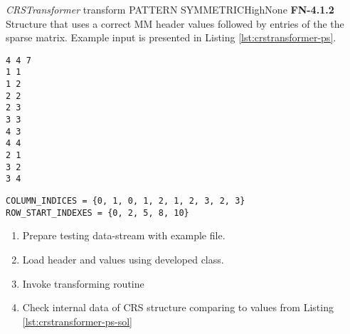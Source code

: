 \begin{testcase}{\emph{CRSTransformer} transform PATTERN SYMMETRIC}{High}{None}
	{
		\textbf{FN-4.1.2}
	}
	{
		Structure that uses a correct \gls{MM} header values followed by entries of the the sparse matrix. Example input is presented in Listing \ref{lst:crstransformer-ps}. 	
	}
	\begin{lstlisting}[label={lst:crstransformer-ps},
	basicstyle=\small,caption={\gls{MM} format data example}, frame=single]
%%MatrixMarket matrix coordinate pattern symmetric
4 4 7
1 1 
1 2 
2 2 
2 3 
3 3 
4 3 
4 4 
2 1 
3 2 
3 4 
	\end{lstlisting}
	\begin{lstlisting}[label={lst:crstransformer-ps-sol},
	basicstyle=\small,caption={\gls{CRS} format internal data example}, frame=single]
COLUMN_INDICES = {0, 1, 0, 1, 2, 1, 2, 3, 2, 3}
ROW_START_INDEXES = {0, 2, 5, 8, 10}
	\end{lstlisting}
	{
		\begin{enumerate}
			\item Prepare testing data-stream with example file.
			\item Load header and values using developed class.
			\item Invoke transforming routine 
			\item
			{
				Check internal data of \gls{CRS} structure comparing to values from Listing \ref{lst:crstransformer-ps-sol} 
			}
		\end{enumerate}
	}
\end{testcase}